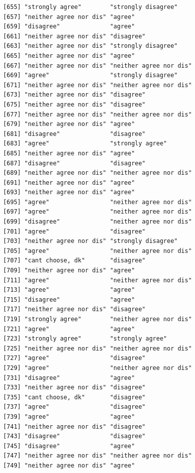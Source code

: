 \documentclass{beamer}\usepackage[]{graphicx}\usepackage[]{color}
\makeatletter
\newenvironment{kframe}{%
 \def\at@end@of@kframe{}%
 \ifinner\ifhmode%
  \def\at@end@of@kframe{\end{minipage}}%
  \begin{minipage}{\columnwidth}%
 \fi\fi%
 \def\FrameCommand##1{\hskip\@totalleftmargin \hskip-\fboxsep
 \colorbox{shadecolor}{##1}\hskip-\fboxsep
     \hskip-\linewidth \hskip-\@totalleftmargin \hskip\columnwidth}%
 \MakeFramed {\advance\hsize-\width
   \@totalleftmargin\z@ \linewidth\hsize
   \@setminipage}}%
 {\par\unskip\endMakeFramed%
 \at@end@of@kframe}
\newenvironment{knitrout}{}{} %
\makeatother
\begin{document}
\begin{frame}[fragile]
\begin{knitrout}
\begin{kframe}
\begin{verbatim}
 [655] "strongly agree"        "strongly disagree"    
 [657] "neither agree nor dis" "agree"                
 [659] "disagree"              "agree"                
 [661] "neither agree nor dis" "disagree"             
 [663] "neither agree nor dis" "strongly disagree"    
 [665] "neither agree nor dis" "agree"                
 [667] "neither agree nor dis" "neither agree nor dis"
 [669] "agree"                 "strongly disagree"    
 [671] "neither agree nor dis" "neither agree nor dis"
 [673] "neither agree nor dis" "disagree"             
 [675] "neither agree nor dis" "disagree"             
 [677] "neither agree nor dis" "neither agree nor dis"
 [679] "neither agree nor dis" "agree"                
 [681] "disagree"              "disagree"             
 [683] "agree"                 "strongly agree"       
 [685] "neither agree nor dis" "agree"                
 [687] "disagree"              "disagree"             
 [689] "neither agree nor dis" "neither agree nor dis"
 [691] "neither agree nor dis" "agree"                
 [693] "neither agree nor dis" "agree"                
 [695] "agree"                 "neither agree nor dis"
 [697] "agree"                 "neither agree nor dis"
 [699] "disagree"              "neither agree nor dis"
 [701] "agree"                 "disagree"             
 [703] "neither agree nor dis" "strongly disagree"    
 [705] "agree"                 "neither agree nor dis"
 [707] "cant choose, dk"       "disagree"             
 [709] "neither agree nor dis" "agree"                
 [711] "agree"                 "neither agree nor dis"
 [713] "agree"                 "agree"                
 [715] "disagree"              "agree"                
 [717] "neither agree nor dis" "disagree"             
 [719] "strongly agree"        "neither agree nor dis"
 [721] "agree"                 "agree"                
 [723] "strongly agree"        "strongly agree"       
 [725] "neither agree nor dis" "neither agree nor dis"
 [727] "agree"                 "disagree"             
 [729] "agree"                 "neither agree nor dis"
 [731] "disagree"              "agree"                
 [733] "neither agree nor dis" "disagree"             
 [735] "cant choose, dk"       "disagree"             
 [737] "agree"                 "disagree"             
 [739] "agree"                 "agree"                
 [741] "neither agree nor dis" "disagree"             
 [743] "disagree"              "disagree"             
 [745] "disagree"              "agree"                
 [747] "neither agree nor dis" "neither agree nor dis"
 [749] "neither agree nor dis" "agree"                

\end{verbatim}
\end{kframe}
\end{knitrout}
\end{frame}
\end{document}
